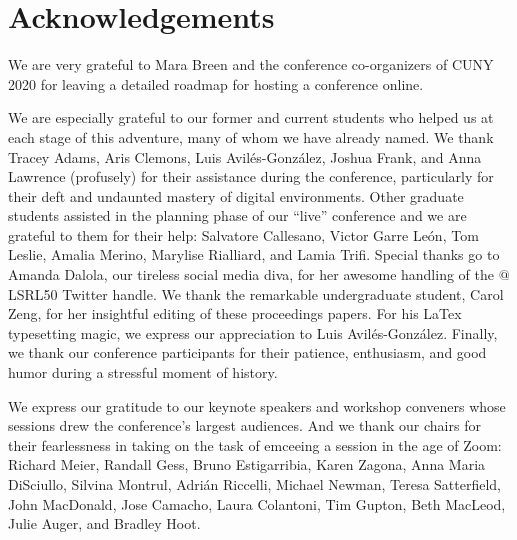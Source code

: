 \documentclass[output=paper,draftmode]{langscibook}
\begin{document}
\section{Acknowledgements}
We are very grateful to Mara Breen and the conference co-organizers of CUNY 2020 for leaving a detailed roadmap for hosting a conference online.

We are especially grateful to our former and current students who helped us at each stage of this adventure, many of whom we have already named. We thank Tracey Adams, Aris Clemons, Luis Avilés-González, Joshua Frank, and Anna Lawrence (profusely) for their assistance during the conference, particularly for their deft and undaunted mastery of digital environments. Other graduate students assisted in the planning phase of our “live” conference and we are grateful to them for their help: Salvatore Callesano, Victor Garre León, Tom Leslie, Amalia Merino, Marylise Rialliard, and Lamia Trifi. Special thanks go to Amanda Dalola, our tireless social media diva, for her awesome handling of the $@$LSRL50 Twitter handle.  We thank the remarkable undergraduate student, Carol Zeng, for her insightful editing of these proceedings papers. For his LaTex typesetting magic, we express our appreciation to Luis Avilés-González. Finally, we thank our conference participants for their patience, enthusiasm, and good humor during a stressful moment of history.

We express our gratitude to our keynote speakers and workshop conveners whose sessions drew the conference’s largest audiences. And we thank our chairs for their fearlessness in taking on the task of emceeing a session in the age of Zoom: Richard Meier, Randall Gess, Bruno Estigarribia, Karen Zagona, Anna Maria DiSciullo, Silvina Montrul, Adrián Riccelli, Michael Newman, Teresa Satterfield, John MacDonald, Jose Camacho, Laura Colantoni, Tim Gupton, Beth MacLeod, Julie Auger, and Bradley Hoot.
\end{document}
